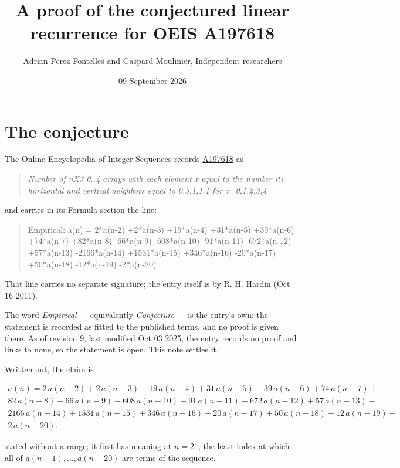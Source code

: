 \documentclass[11pt]{article}
\title{A proof of the conjectured linear recurrence for OEIS A197618}
\author{Adrian Perez Fontelles and Gaspard Moulinier, Independent researchers}
\date{09 September 2026}
\theoremstyle{definition}
\begin{document}
\maketitle
\section{The conjecture}

The Online Encyclopedia of Integer Sequences records \href{https://oeis.org/A197618}{A197618} as

\begin{quote}\itshape Number of nX3 0..4 arrays with each element x equal to the number its horizontal and vertical neighbors equal to 0,3,1,1,1 for x=0,1,2,3,4\end{quote}

and carries in its Formula section the line:

\begin{quote}\ttfamily Empirical: a(n) = 2*a(n-2) +2*a(n-3) +19*a(n-4) +31*a(n-5) +39*a(n-6) +74*a(n-7) +82*a(n-8) -66*a(n-9) -608*a(n-10) -91*a(n-11) -672*a(n-12) +57*a(n-13) -2166*a(n-14) +1531*a(n-15) +346*a(n-16) -20*a(n-17) +50*a(n-18) -12*a(n-19) -2*a(n-20)\end{quote}

That line carries no separate signature; the entry itself is by R. H. Hardin (Oct 16 2011).

The word {\itshape Empirical} --- equivalently {\itshape Conjecture} --- is the entry's own: the statement is recorded as fitted to the published terms, and no proof is given there. As of revision 9, last modified Oct 03 2025, the entry records no proof and links to none, so the statement is open. This note settles it.

Written out, the claim is

\begin{multline*} a(n) = 2\,a(n-2) + 2\,a(n-3) + 19\,a(n-4) + 31\,a(n-5) + 39\,a(n-6) + 74\,a(n-7) + \\ 82\,a(n-8) - 66\,a(n-9) - 608\,a(n-10) - 91\,a(n-11) - 672\,a(n-12) + 57\,a(n-13) - \\ 2166\,a(n-14) + 1531\,a(n-15) + 346\,a(n-16) - 20\,a(n-17) + 50\,a(n-18) - 12\,a(n-19) - \\ 2\,a(n-20). \end{multline*}

stated without a range; it first has meaning at $n = 21$, the least index at which all of $a(n-1),\dots,a(n-20)$ are terms of the sequence.
\end{document}
